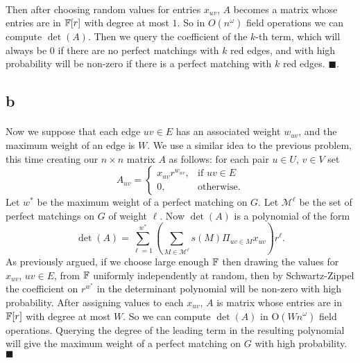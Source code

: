 \documentclass[letterpaper,12pt,oneside,onecolumn]{article}
\newcommand{\cM}{\mathcal{M}} \newcommand{\cN}{\mathcal{N}}
\begin{document}
\paragraph{}
Then after choosing random values for entries $x_{uv}$, $A$ becomes a matrix whose entries are in $\mathbb{F}[r]$ with degree at most $1$. So in $O(n^\omega)$ field operations we can compute $\det(A)$. Then we query the coefficient of the $k$-th term, which will always be $0$ if there are no perfect matchings with $k$ red edges, and with high probability will be non-zero if there is a perfect matching with $k$ red edges. $\blacksquare$.
\subsection{b}
\paragraph{}
Now we suppose that each edge $uv \in E$ has an associated weight $w_{uv}$, and the maximum weight of an edge is $W$. We use a similar idea to the previous problem, this time creating our $n\times n$ matrix $A$ as follows: for each pair $u \in U$, $v\in V$ set
$$A_{uv} = \begin{cases}
	x_{uv}r^{w_{uv}}, &\text{if $uv \in E$} \\
	0, &\text{otherwise.}
	\end{cases}$$
Let $w^*$ be the maximum weight of a perfect matching on $G$. Let $\cM^\ell$ be the set of perfect matchings on $G$ of weight $\ell$. Now $\det(A)$ is a polynomial of the form
$$\det(A) = \sum_{\ell = 1}^{w^*} (\sum_{M \in \cM^\ell} s(M)\Pi_{uv \in M}x_{uv})r^\ell.$$
As previously argued, if we choose large enough $\mathbb{F}$ then drawing the values for $x_{uv}$, $uv \in E$, from $\mathbb{F}$ uniformly independently at random, then by Schwartz-Zippel the coefficient on $r^{w^*}$ in the determinant polynomial will be non-zero with high probability. After assigning values to each $x_{uv}$, $A$ is matrix whose entries are in $\mathbb{F}[r]$ with degree at most $W$. So we can compute $\det(A)$ in O$(Wn^\omega)$ field operations. Querying the degree of the leading term in the resulting polynomial will give the maximum weight of a perfect matching on $G$ with high probability. $\blacksquare$
\newpage
\section{}
\end{document}
